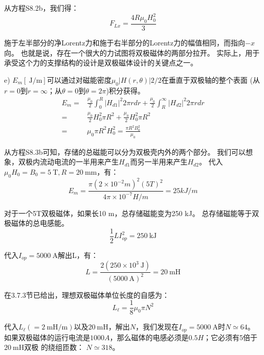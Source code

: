 从方程S8.2b，我们得：
\begin{equation*}
F_{Lx}=\frac{4R\mu_{0}H_{0}^{2}}{3}\tag{3.142}
\end{equation*}

施于左半部分的净Lorentz力和施于右半部分的Lorentz力的幅值相同，而指向$-x$向。
也就是说，存在一个很大的力试图将双极磁体的两部分拉开。
实际上，用于承受这个力的支撑结构的设计是双极磁体设计的关键点之一。

e) $E_m [\ \mathrm{J/m}]$可以通过对磁能密度$\mu_0|H(r,\theta)|2/2$在垂直于双极轴的整个表面
(从$r=0$到$r=\infty$；从$\theta=0$到$\theta=2\pi$)积分获得。
\begin{align*}
E_{m}=&\frac{\mu_{0}}{2}\int_{0}^{R}|H_{d1}|^{2}2\pi rdr+\frac{\mu_{0}}{2}\int_{R}^{\infty}|H_{d2}|^{2}2\pi rdr\tag{S8.3a}\\%
=&\frac{\mu_{0}}{2}H_{0}^{2}\pi R^{2}+\frac{\mu_{0}}{2}H_{0}^{2}\pi R^{2}\tag{S8.3b}\\%
=&\mu_{0}\pi R^{2}H_{0}^{2}=\frac{\pi R^{2}B_{0}^{2}}{\mu_{0}}\tag{3.143}%
\end{align*}

从方程S8.3b可知，存储的总磁能可以分为双极壳内外的两个部分。
我们可以想象，双极内流动电流的一半用来产生$H_{d1}$而另一半用来产生$H_{d2}$。
代入$\mu_0 H_0=B_0=5\ \mathrm{T},R=20\ \mathrm{mm}$，有：
\begin{equation*}
E_{m}=\frac{\pi(2\times 10^{-2}m)^{2}(5T)^{2}}{4\pi\times10^{-7}H/m}=25kJ/m
\end{equation*}

对于一个5T双极磁体，如果长10 m，总存储磁能变为250 kJ。
总存储磁能等于双极磁体的总电感能。
\begin{equation*}
\frac{1}{2}LI_{op}^{2}=250\ \mathrm{kJ}\tag{S8.4}%
\end{equation*}

代入$I_{op}=5000\ \mathrm{A}$解出L，有：
\begin{equation*}
L=\frac{2(250\times10^{3}\ \mathrm{J})}{(5000\ \mathrm{A})^{2}}=20\ \mathrm{mH}
\end{equation*}

在3.7.3节已给出，理想双极磁体单位长度的自感为： 
\begin{equation*}
L_{\ell}=\frac{1}{8}\mu_{0}\pi N^{2}\tag{3.87}%
\end{equation*}

代入$L_{\ell}(=2\ \mathrm{mH/m})$以及$20\ \mathrm{mH}$，解出$N$，我们发现在$I_{op} = 5000\ \mathrm{A}$时$N\simeq 64$。
如果双极磁体的运行电流是$1000A$，那么磁体的电感必须是$0.5H$；它必须有5倍于$20\ \mathrm{mH}$双极
的绕组匝数： $N\simeq 318$。

